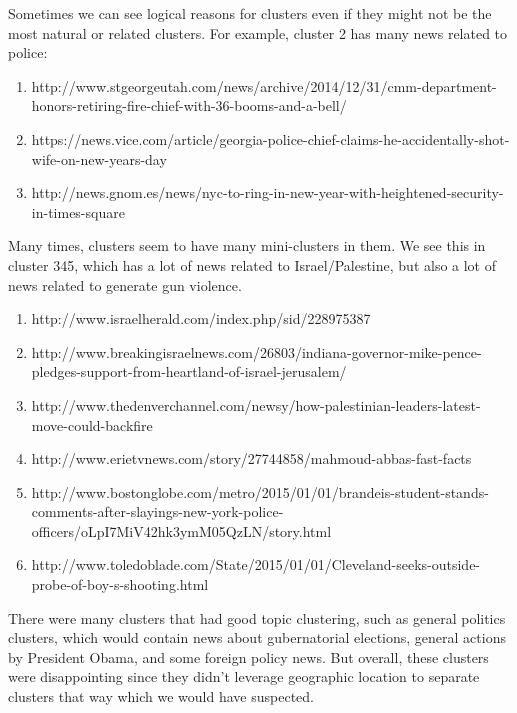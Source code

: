 \documentclass{article}
\begin{document}
	Sometimes we can see logical reasons for clusters even if they might not be the most natural or related clusters. For example, cluster 2 has many news related to police:
	\begin{enumerate}
	\item http://www.stgeorgeutah.com/news/archive/2014/12/31/cmm-department-honors-retiring-fire-chief-with-36-booms-and-a-bell/
	\item https://news.vice.com/article/georgia-police-chief-claims-he-accidentally-shot-wife-on-new-years-day
	\item
	http://news.gnom.es/news/nyc-to-ring-in-new-year-with-heightened-security-in-times-square
	\end{enumerate}

	Many times, clusters seem to have many mini-clusters in them. We see this in cluster 345, which has a lot of news related to Israel/Palestine, but also a lot of news related to generate gun violence.
	\begin{enumerate}
	\item http://www.israelherald.com/index.php/sid/228975387
	\item http://www.breakingisraelnews.com/26803/indiana-governor-mike-pence-pledges-support-from-heartland-of-israel-jerusalem/
	\item http://www.thedenverchannel.com/newsy/how-palestinian-leaders-latest-move-could-backfire
	\item http://www.erietvnews.com/story/27744858/mahmoud-abbas-fast-facts
	\item http://www.bostonglobe.com/metro/2015/01/01/brandeis-student-stands-comments-after-slayings-new-york-police-officers/oLpI7MiV42hk3ymM05QzLN/story.html
	\item http://www.toledoblade.com/State/2015/01/01/Cleveland-seeks-outside-probe-of-boy-s-shooting.html
	\end{enumerate}

	There were many clusters that had good topic clustering, such as general politics clusters, which would contain news about gubernatorial elections, general actions by President Obama, and some foreign policy news. But overall, these clusters were disappointing since they didn't leverage geographic location to separate clusters that way which we would have suspected. 
\end{document}
